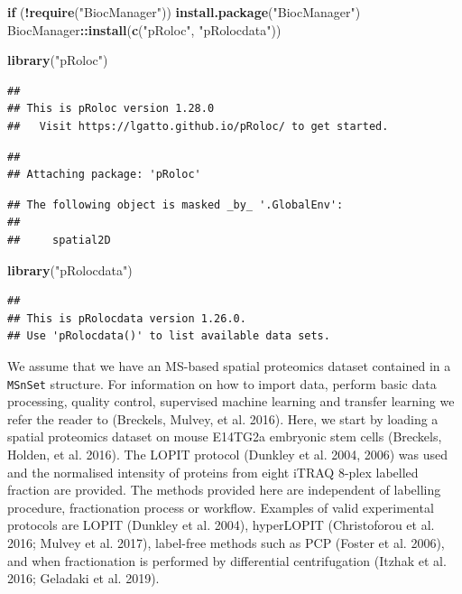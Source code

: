 \documentclass[
]{article}
\newenvironment{Shaded}{\begin{snugshade}}{\end{snugshade}}
\newcommand{\ControlFlowTok}[1]{\textcolor[rgb]{0.13,0.29,0.53}{\textbf{#1}}}
\newcommand{\KeywordTok}[1]{\textcolor[rgb]{0.13,0.29,0.53}{\textbf{#1}}}
\newcommand{\NormalTok}[1]{#1}
\newcommand{\OperatorTok}[1]{\textcolor[rgb]{0.81,0.36,0.00}{\textbf{#1}}}
\newcommand{\StringTok}[1]{\textcolor[rgb]{0.31,0.60,0.02}{#1}}
\begin{document}
\begin{Shaded}
\begin{Highlighting}[]
\ControlFlowTok{if}\NormalTok{ (}\OperatorTok{!}\KeywordTok{require}\NormalTok{(}\StringTok{"BiocManager"}\NormalTok{))}
    \KeywordTok{install.package}\NormalTok{(}\StringTok{"BiocManager"}\NormalTok{)}
\NormalTok{BiocManager}\OperatorTok{::}\KeywordTok{install}\NormalTok{(}\KeywordTok{c}\NormalTok{(}\StringTok{"pRoloc"}\NormalTok{, }\StringTok{"pRolocdata"}\NormalTok{))}
\end{Highlighting}
\end{Shaded}

\begin{Shaded}
\begin{Highlighting}[]
\KeywordTok{library}\NormalTok{(}\StringTok{"pRoloc"}\NormalTok{)}
\end{Highlighting}
\end{Shaded}

\begin{verbatim}
## 
## This is pRoloc version 1.28.0 
##   Visit https://lgatto.github.io/pRoloc/ to get started.
\end{verbatim}

\begin{verbatim}
## 
## Attaching package: 'pRoloc'
\end{verbatim}

\begin{verbatim}
## The following object is masked _by_ '.GlobalEnv':
## 
##     spatial2D
\end{verbatim}

\begin{Shaded}
\begin{Highlighting}[]
\KeywordTok{library}\NormalTok{(}\StringTok{"pRolocdata"}\NormalTok{)}
\end{Highlighting}
\end{Shaded}

\begin{verbatim}
## 
## This is pRolocdata version 1.26.0.
## Use 'pRolocdata()' to list available data sets.
\end{verbatim}

We assume that we have an MS-based spatial proteomics dataset contained
in a \texttt{MSnSet} structure. For information on how to import data,
perform basic data processing, quality control, supervised machine
learning and transfer learning we refer the reader to (Breckels, Mulvey,
et al. 2016). Here, we start by loading a spatial proteomics dataset on
mouse E14TG2a embryonic stem cells (Breckels, Holden, et al. 2016). The
LOPIT protocol (Dunkley et al. 2004, 2006) was used and the normalised
intensity of proteins from eight iTRAQ 8-plex labelled fraction are
provided. The methods provided here are independent of labelling
procedure, fractionation process or workflow. Examples of valid
experimental protocols are LOPIT (Dunkley et al. 2004), hyperLOPIT
(Christoforou et al. 2016; Mulvey et al. 2017), label-free methods such
as PCP (Foster et al. 2006), and when fractionation is performed by
differential centrifugation (Itzhak et al. 2016; Geladaki et al. 2019).
\end{document}

